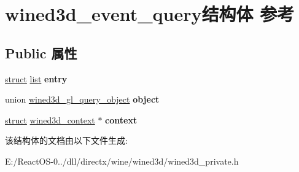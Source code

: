 \hypertarget{structwined3d__event__query}{}\section{wined3d\+\_\+event\+\_\+query结构体 参考}
\label{structwined3d__event__query}
\subsection*{Public 属性}
\begin{DoxyCompactItemize}
\item 
\mbox{\label{structwined3d__event__query_ac2aeb9326db622f5acb2b63834ddc717}} 
\hyperlink{interfacestruct}{struct} \hyperlink{classlist}{list} {\bfseries entry}
\item 
\mbox{\label{structwined3d__event__query_adbb9c5ca0c546e9aa14f286b1d36e1fa}} 
union \hyperlink{unionwined3d__gl__query__object}{wined3d\+\_\+gl\+\_\+query\+\_\+object} {\bfseries object}
\item 
\mbox{\label{structwined3d__event__query_a55c04af31b060620d0127b5aa2970c7b}} 
\hyperlink{interfacestruct}{struct} \hyperlink{structwined3d__context}{wined3d\+\_\+context} $\ast$ {\bfseries context}
\end{DoxyCompactItemize}


该结构体的文档由以下文件生成\+:\begin{DoxyCompactItemize}
\item 
E\+:/\+React\+O\+S-\/0../dll/directx/wine/wined3d/wined3d\+\_\+private.\+h\end{DoxyCompactItemize}
